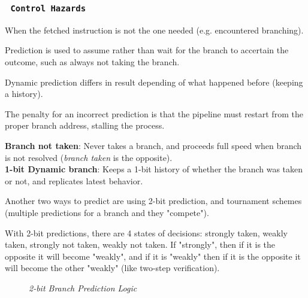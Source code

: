 \documentclass[11pt]{article}
\begin{document}
\subsubsection*{\rightarrow \ \texttt{Control Hazards}}
\vspace{-0.5em}

When the fetched instruction is not the one needed (e.g. encountered branching).

Prediction is used to assume rather than wait for the branch to accertain the outcome, such as always not taking the branch.

Dynamic prediction differs in result depending of what happened before (keeping a history).

The penalty for an incorrect prediction is that the pipeline must restart from the proper branch address, stalling the process.

\begin{tcolorbox}[
    enhanced,
    attach boxed title to top left={xshift=6mm,yshift=-1.5mm},
    colback=moonstoneblue!20,
    colframe=moonstoneblue,
    colbacktitle=moonstoneblue,
    title=Simple Branch Prediction Methodologies,
    fonttitle=\bfseries\color{white},
    boxed title style={size=small,colframe=moonstoneblue,sharp corners},
    sharp corners,
    label=box:logic-types,
]
    {\color{moondark}\textbf{Branch not taken}}: Never takes a branch, and proceeds full speed when branch is not resolved (\textit{branch taken} is the opposite). \\
    {\color{moondark}\textbf{1-bit Dynamic branch}}: Keeps a 1-bit history of whether the branch was taken or not, and replicates latest behavior.
\end{tcolorbox}

Another two ways to predict are using 2-bit prediction, and tournament schemes (multiple predictions for a branch and they "compete").

With 2-bit predictions, there are 4 states of decisions: strongly taken, weakly taken, strongly not taken, weakly not taken. If "strongly", then if it is the opposite it will become "weakly", and if it is "weakly" then if it is the opposite it will become the other "weakly" (like two-step verification).

\begin{figure}[htbp]
    \centering
    \caption{\textit{2-bit Branch Prediction Logic}}
\end{figure}
\end{document}
